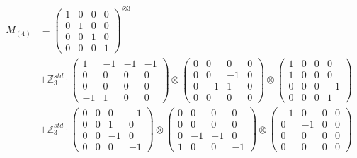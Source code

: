 \documentclass{article}
\newcommand{\Mthree}{%
    M_{(4)}
}
\begin{document}
        \footnotesize{
        \begin{align}
        \Mthree
        &= \label{Rs1-Rc16-Solution-2-c1} \begin{pmatrix} 1 & 0 & 0 & 0 \\ 0 & 1 & 0 & 0 \\ 0 & 0 & 1 & 0 \\ 0 & 0 & 0 & 1 \end{pmatrix}^{\otimes 3} \\
        &+ \label{Rs1-Rc16-Solution-2-c2} \mathbb{Z}_3^{std} \cdot 
            \begin{pmatrix} 1 & -1 & -1 & -1 \\ 0 & 0 & 0 & 0 \\ 0 & 0 & 0 & 0 \\ -1 & 1 & 0 & 0 \end{pmatrix} \otimes 
            \begin{pmatrix} 0 & 0 & 0 & 0 \\ 0 & 0 & -1 & 0 \\ 0 & -1 & 1 & 0 \\ 0 & 0 & 0 & 0 \end{pmatrix} \otimes 
            \begin{pmatrix} 1 & 0 & 0 & 0 \\ 1 & 0 & 0 & 0 \\ 0 & 0 & 0 & -1 \\ 0 & 0 & 0 & 1 \end{pmatrix} \\ 
        &+ \label{Rs1-Rc16-Solution-2-c3} \mathbb{Z}_3^{std} \cdot 
            \begin{pmatrix} 0 & 0 & 0 & -1 \\ 0 & 0 & 1 & 0 \\ 0 & 0 & -1 & 0 \\ 0 & 0 & 0 & -1 \end{pmatrix} \otimes 
            \begin{pmatrix} 0 & 0 & 0 & 0 \\ 0 & 0 & 0 & 0 \\ 0 & -1 & -1 & 0 \\ 1 & 0 & 0 & -1 \end{pmatrix} \otimes 
            \begin{pmatrix} -1 & 0 & 0 & 0 \\ 0 & -1 & 0 & 0 \\ 0 & 0 & 0 & 0 \\ 0 & 0 & 0 & 0 \end{pmatrix} \\ 

\end{align}}
\end{document}
